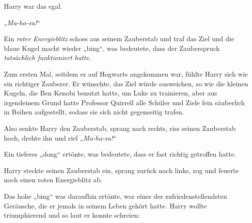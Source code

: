 Harry war das egal.

„\emph{Ma-ha-su!}“

Ein \emph{roter Energieblitz} schoss aus seinem Zauberstab und traf das Ziel und die blaue Kugel macht wieder „bing“, was bedeutete, dass der Zauberspruch \emph{tatsächlich funktioniert hatte.}

Zum ersten Mal, seitdem er auf Hogwarts angekommen war, fühlte Harry sich wie ein richtiger Zauberer. Er wünschte, das Ziel würde ausweichen, so wie die kleinen Kugeln, die Ben Kenobi benutzt hatte, um Luke zu trainieren, aber aus irgendeinem Grund hatte Professor Quirrell alle Schüler und Ziele fein säuberlich in Reihen aufgestellt, sodass sie sich nicht gegenseitig trafen.

Also senkte Harry den Zauberstab, sprang nach rechts, riss seinen Zauberstab hoch, drehte ihn und rief „\emph{Ma-ha-su!}“

Ein tieferes „dong“ ertönte, was bedeutete, dass er fast richtig getroffen hatte.

Harry steckte seinen Zauberstab ein, sprang zurück nach links, zog und feuerte noch einen roten Energieblitz ab.

Das hohe „bing“ was daraufhin ertönte, war eines der zufriedenstellendsten Geräusche, die er jemals in seinem Leben gehört hatte. Harry wollte triumphierend und so laut er konnte schreien: \emph{}

